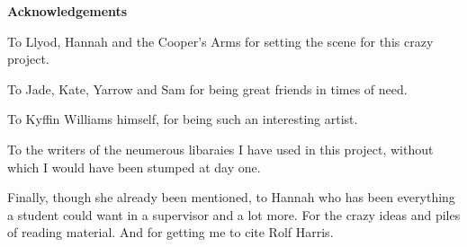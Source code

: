 \thispagestyle{empty}

\begin{center}
    {\LARGE\bf Acknowledgements}
\end{center}

To Llyod, Hannah and the Cooper's Arms for setting the scene for this crazy project.

To Jade, Kate, Yarrow and Sam for being great friends in times of need.

To Kyffin Williams himself, for being such an interesting artist.

To the writers of the neumerous libaraies I have used in this project, without which I would have been stumped at day one.

Finally, though she already been mentioned, to Hannah who has been everything a student could want in a supervisor and a lot more. For the crazy ideas and piles of reading material. And for getting me to cite Rolf Harris.
